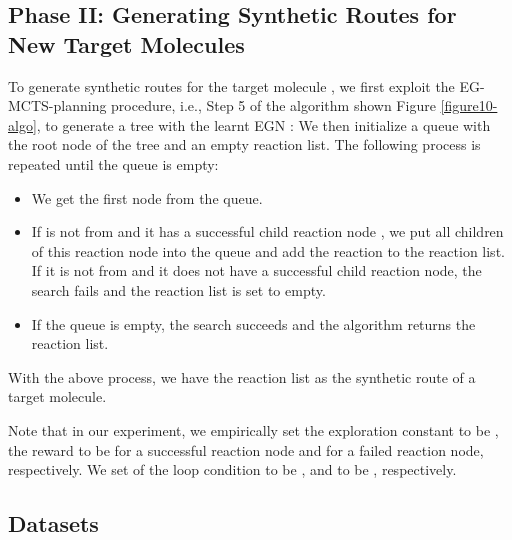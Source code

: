 \documentclass[sn-mathphys,Numbered]{sn-jnl}
\begin{document}
\subsection{Phase II: Generating Synthetic Routes for New Target Molecules}
To generate synthetic routes for the target molecule , we first exploit the EG-MCTS-planning procedure, i.e., Step 5 of the algorithm shown Figure \ref{figure10-algo}, to generate a tree with the learnt EGN :  We then initialize a queue with the root node of the tree and an empty reaction list.
The following process is repeated until the queue is empty: 
\begin{itemize}
    \item We get the first node  from the queue.
    \item If  is not from  and it has a successful child reaction node , we put all children  of this reaction node  into the queue and add the reaction  to the reaction list. If it is not from  and it does not have a successful child reaction node, the search fails and the reaction list is set to empty.
    
    \item If the queue is empty, the search succeeds and the algorithm returns the reaction list.
\end{itemize}
With the above process, we have the reaction list as the synthetic route of a target molecule.


Note that in our experiment, we empirically set the exploration constant  to be , the reward  to be  for a successful reaction node and  for a failed reaction node, respectively. We set  of the loop condition  to be , and  to be , respectively.











\subsection{Datasets}\label{datasets}
\end{document}
